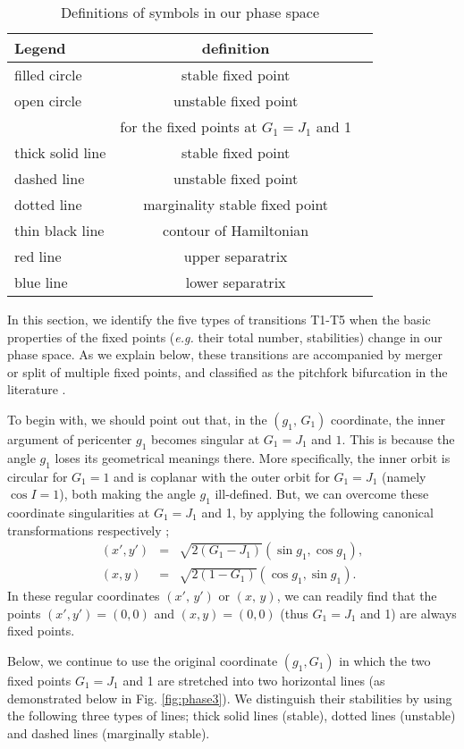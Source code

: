 \documentclass[useAMS,usenatbib,twocolumn]{mn2e}
\newcommand{\beqa}{\begin{eqnarray}}
\newcommand{\eeqa}{\end{eqnarray}}
\begin{document}
\begin{table}
\caption{Definitions of symbols in our phase space}
\label{tab:1}
\begin{tabular}{lcc}
\hline
Legend & definition \\
\hline
\hline 
 filled circle & stable fixed point\\
open circle & unstable fixed point\\
\hline 
\hline 
    &    for the fixed points at $G_1=J_1$ and 1\\
thick solid line & stable fixed point \\
dashed line &  unstable fixed point\\
dotted line &  marginality stable fixed point \\
\hline
\hline 
thin black  line & contour of Hamiltonian \\
red line & upper separatrix \\
blue line & lower separatrix \\
\hline
\end{tabular}
\end{table}


In this section, we identify the five types of  transitions T1-T5 when the basic properties  of the fixed points ({\it e.g.} their total number, stabilities)  change in our phase space. As we explain below, these transitions are  accompanied by  merger or split of multiple fixed points, and classified as the pitchfork bifurcation  in the literature \citep[e.g.][]{Strogatz}.

To begin with, we should point out that, in the $(g_1,\, G_1)$ coordinate, the inner argument of pericenter $g_1$ becomes singular at  $G_1=J_1$ and $1$. This is because the angle $g_1$ loses its geometrical meanings there. More specifically, the inner orbit is circular for $G_1=1$ and is coplanar with 
the outer orbit for $G_1=J_1$ (namely $\cos I =1$), both making the angle $g_1$ ill-defined.
But, we can overcome these coordinate singularities at $G_1=J_1$ and 1,  by applying the following canonical transformations respectively \citep{ivanov2005};
\beqa
(x', y')&=&\sqrt{2(G_{1}-J_{1})}(\sin g_{1}, \cos g_{1}),\label{ct1}\\
(x, y)&=&\sqrt{2(1-G_{1})}(\cos g_{1}, \sin g_{1}).
\eeqa
In these regular coordinates $(x',\,y')$ or $(x,\,y)$, we can readily find that the points $(x',y')=(0,0)$ and $(x,y)=(0,0)$ (thus $G_1=J_1$ and 1) are always fixed points.

Below, we continue to use the original coordinate $(g_1,G_1)$ in which
 the two fixed points $G_1=J_1$ and 1 are stretched into two horizontal lines  (as demonstrated below in Fig. \ref{fig:phase3}). We distinguish their stabilities by using the following three types of lines; thick solid lines (stable), dotted lines (unstable) and dashed lines (marginally stable).
\end{document}
